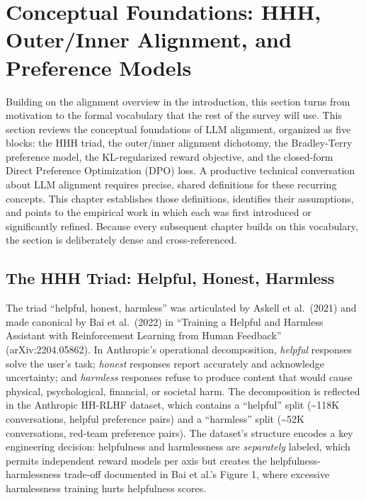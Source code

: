 \section{Conceptual Foundations: HHH, Outer/Inner Alignment, and Preference Models}\label{conceptual-foundations-hhh-outerinner-alignment-and-preference-models}

Building on the alignment overview in the introduction, this section turns from motivation to the formal vocabulary that the rest of the survey will use. This section reviews the conceptual foundations of LLM alignment, organized as five blocks: the HHH triad, the outer/inner alignment dichotomy, the Bradley-Terry preference model, the KL-regularized reward objective, and the closed-form Direct Preference Optimization (DPO) loss. A productive technical conversation about LLM alignment requires precise, shared definitions for these recurring concepts. This chapter establishes those definitions, identifies their assumptions, and points to the empirical work in which each was first introduced or significantly refined. Because every subsequent chapter builds on this vocabulary, the section is deliberately dense and cross-referenced.

\subsection{The HHH Triad: Helpful, Honest, Harmless}\label{the-hhh-triad-helpful-honest-harmless}

The triad ``helpful, honest, harmless'' was articulated by Askell et al.~(2021) and made canonical by Bai et al.~(2022) in ``Training a Helpful and Harmless Assistant with Reinforcement Learning from Human Feedback'' (arXiv:2204.05862). In Anthropic's operational decomposition, \emph{helpful} responses solve the user's task; \emph{honest} responses report accurately and acknowledge uncertainty; and \emph{harmless} responses refuse to produce content that would cause physical, psychological, financial, or societal harm. The decomposition is reflected in the Anthropic HH-RLHF dataset, which contains a ``helpful'' split (\textasciitilde118K conversations, helpful preference pairs) and a ``harmless'' split (\textasciitilde52K conversations, red-team preference pairs). The dataset's structure encodes a key engineering decision: helpfulness and harmlessness are \emph{separately} labeled, which permits independent reward models per axis but creates the helpfulness-harmlessness trade-off documented in Bai et al.'s Figure 1, where excessive harmlessness training hurts helpfulness scores.

